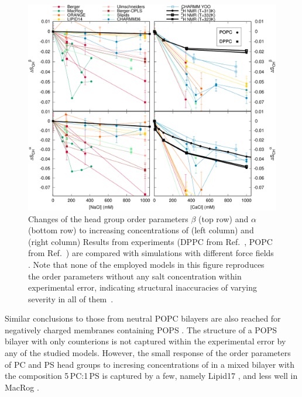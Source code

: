 \begin{figure}[tbp]
  \centering
  \includegraphics[width=\figwidthfull]{../img/OrderParameterIONSchanges.pdf}
  \caption{\label{fig:catte16}
    Changes of the head group order parameters $\beta$ (top row) and $\alpha$ (bottom row) 
    to increasing concentrations of  (left column) and  (right column)
    Results from experiments 
    (DPPC from Ref.~\citep{akutsu81}, POPC from Ref.~\citep{altenbach84}) 
    are compared with simulations with different force fields \citep{nmrlipids, catte16}. 
    Note that none of the employed models in this figure reproduces the order parameters without any salt concentration
    within experimental error, indicating structural inaccuracies of varying severity in all of them~\citep{botan15}.
  }
\end{figure}


Similar conclusions to those from neutral POPC bilayers 
are also reached for negatively charged membranes containing POPS \citep{nmrlipids_proj4}. 
The structure of a POPS bilayer with only  counterions
is not captured within the experimental error by any of the studied models. 
However, the small response of the order parameters of PC and PS head groups 
to incresing concentrations of  in a mixed bilayer with the composition 5\,PC:1\,PS 
is captured by a few, 
namely Lipid17 \citep{lipid17-future},
and less well in MacRog \citep{maciejewski14}. 

